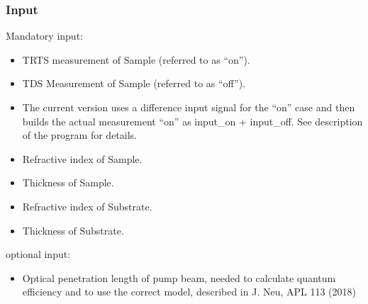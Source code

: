 \documentclass[12pt]{article}
\begin{document}
\subsubsection{Input}
Mandatory input:
\begin{itemize}
	\item TRTS measurement of Sample (referred to as "`on"').
	\item TDS Measurement of Sample (referred to as "`off"'). 
	\item The current version uses a difference input signal for the "`on"' case and then builds the actual measurement "`on"' as input\_on + input\_off. See description of the program for details. 
	\item Refractive index of Sample.
	\item Thickness of Sample.
  \item Refractive index of Substrate.
	\item Thickness of Substrate.
\end{itemize}
optional input:
\begin{itemize}
	\item Optical penetration length of pump beam, needed to calculate quantum efficiency and to use the correct model, described in J. Neu, APL 113 (2018) \cite{thinfilm}
\end{itemize}
\end{document}
